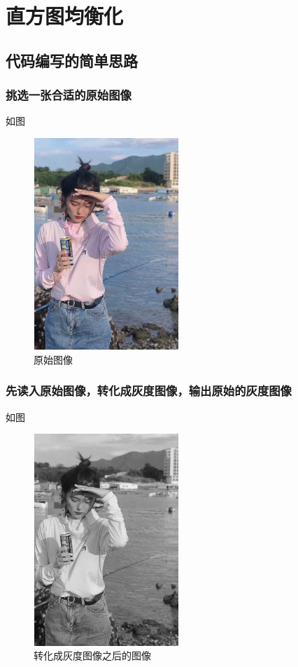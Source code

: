 \documentclass{article}
\begin{document}
\thispagestyle{empty}
\newpage

\setcounter{page}{1}
\section{直方图均衡化}
\subsection{代码编写的简单思路}
\subsubsection{挑选一张合适的原始图像}

  如图
                \begin{figure}[h!]
                \centering
                \includegraphics[width=5.5cm,height=8cm]{xuan.png}
                \caption{原始图像}
                \end{figure}

  \subsubsection{先读入原始图像，转化成灰度图像，输出原始的灰度图像}

  如图
  \begin{figure}[h!]
                \centering
                \includegraphics[width=5.5cm,height=8cm]{xuan1.png}
                \caption{转化成灰度图像之后的图像}
                \end{figure}
\end{document}

